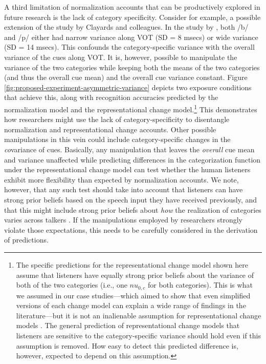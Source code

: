 \documentclass[
  11pt,
  man,floatsintext]{apa6}
\begin{document}
A third limitation of normalization accounts that can be productively explored in future research is the lack of category specificity. Consider for example, a possible extension of the study by Clayards and colleagues. In the study by \textcite{clayards2008}, both /b/ and /p/ either had narrow variance along VOT (SD = 8 msecs) or wide variance (SD = 14 msecs). This confounds the category-specific variance with the overall variance of the cues along VOT. It is, however, possible to manipulate the variance of the two categories while keeping both the means of the two categories (and thus the overall cue mean) and the overall cue variance constant. Figure \ref{fig:proposed-experiment-asymmetric-variance} depicts two exposure conditions that achieve this, along with recognition accuracies predicted by the normalization model and the representational change model.\footnote{The specific predictions for the representational change model shown here assume that listeners have equally strong prior beliefs about the variance of both of the two categories (i.e., one \(nu_{0,c}\) for both categories). This is what we assumed in our case studies---which aimed to show that even simplified versions of each change model can explain a wide range of findings in the literature---but it is not an inalienable assumption for representational change models \autocite[for discussion, see also][]{kleinschmidt-jaeger2015}. The general prediction of representational change models that listeners are sensitive to the category-specific variance should hold even if this assumption is removed. How easy to detect this predicted difference is, however, expected to depend on this assumption.} This demonstrates how researchers might use the lack of category-specificity to disentangle normalization and representational change accounts. Other possible manipulations in this vein could include category-specific changes in the \emph{co}variance of cues. Basically, any manipulation that leaves the \emph{overall} cue mean and variance unaffected while predicting differences in the categorization function under the representational change model can test whether the human listeners exhibit more flexibility than expected by normalization accounts. We note, however, that any such test should take into account that listeners can have strong prior beliefs based on the speech input they have received previously, and that this might include strong prior beliefs about \emph{how} the realization of categories varies across talkers \autocite{kleinschmidt-jaeger2015}. If the manipulations employed by researchers strongly violate those expectations, this needs to be carefully considered in the derivation of predictions.
\end{document}
